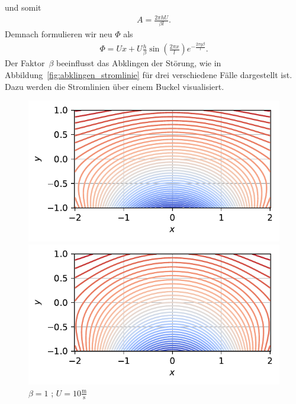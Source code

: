 und somit 
\begin{align*}
    A
    =
    \frac{2 \pi h U}{\beta l}.
\end{align*}
Demnach formulieren wir neu $\Phi$ als
\begin{align*}
    \Phi
    =
    U x + U \frac{h}{\beta} \sin\left(\frac{2 \pi x}{l}\right)
     e^{-\frac{2 \pi y \beta}{l}}.
\end{align*}
Der Faktor~$\beta$ beeinflusst das Abklingen der Störung,
wie in Abbildung~\ref{fig:abklingen_stromlinie} 
für drei verschiedene Fälle dargestellt ist.
Dazu werden die Stromlinien über einem Buckel visualisiert.
\begin{figure}
    \centering
    \begin{minipage}[b]{0.32\textwidth}
        \centering
        \includegraphics[width=\linewidth]{papers/ueberschall/figures/abklingen_10.pdf}
        \caption*{$\beta = 1$ ; $U = 10 \frac{\mathrm{m}}{\mathrm{s}}$}
    \end{minipage}
    \hfill
    \begin{minipage}[b]{0.32\textwidth}
        \centering
        \includegraphics[width=\linewidth]{papers/ueberschall/figures/abklingen_200.pdf}

\end{minipage}
\end{figure}
